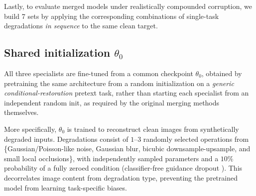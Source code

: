 \documentclass{article}
\newcommand{\todo}[1]{\textbf{\color{red}[TODO: #1]}}
\begin{document}
Lastly, to evaluate merged models under realistically compounded corruption, we build 7 sets by applying the corresponding combinations of single-task degradations \emph{in sequence} to the same clean target.


\subsection{Shared initialization $\theta_0$}
\label{sec:theta0}

All three specialists are fine-tuned from a common checkpoint $\theta_0$, obtained by pretraining the same architecture from a random initialization on a \emph{generic conditional-restoration} pretext task, rather than starting each specialist from an independent random init, as required by the original merging methods themselves.

More specifically, $\theta_0$ is trained to reconstruct clean images from synthetically degraded inputs. Degradations consist of $1$--$3$ randomly selected operations from \{Gaussian/Poisson-like noise, Gaussian blur, bicubic downsample-upsample, and small local occlusions\}, with independently sampled parameters and a $10\%$ probability of a fully zeroed condition (classifier-free guidance dropout \cite{ho2022cfg}). This decorrelates image content from degradation type, preventing the pretrained model from learning task-specific biases.
\end{document}
